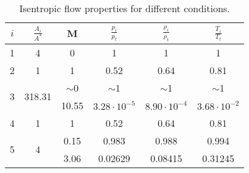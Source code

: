 \begin{table}[H]
\centering
\renewcommand{\arraystretch}{1.4} %
\begin{tabular}{|c|c|c|c|c|c|}
\hline
$i$                  & $\frac{A_i}{A^*}$       & M         & $\frac{p_i}{p_t}$        & $\frac{\rho_i}{\rho_t}$   & $\frac{T_i}{T_t}$      \\ \hline
1                    & 4                       & 0         & 1                        & 1                         & 1                      \\ \hline
2                    & 1                       & 1         & 0.52                     & 0.64                      & 0.81                   \\ \hline
\multirow{2}{*}{3}   & \multirow{2}{*}{318.31} & $\sim$0   & $\sim$1                  & $\sim$1                   & $\sim$1                \\ \cline{3-6} 
                     &                         & 10.55     & $3.28 \cdot 10^{-5}$     & $8.90 \cdot 10^{-4}$      & $3.68 \cdot 10^{-2}$   \\ \hline
4                    & 1                       & 1         & 0.52                     & 0.64                      & 0.81                   \\ \hline
\multirow{2}{*}{5}   & \multirow{2}{*}{4}      & 0.15      & 0.983                    & 0.988                     & 0.994                  \\ \cline{3-6} 
                     &                         & 3.06      & 0.02629                  & 0.08415                   & 0.31245                \\ \hline
\end{tabular}
\caption{Isentropic flow properties for different conditions.}
\label{tab:isentropic_flow}
\end{table}
